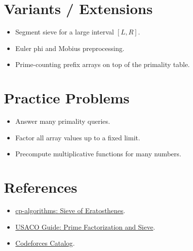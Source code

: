 \section*{Variants / Extensions}

\begin{itemize}
  \item Segment sieve for a large interval \([L, R]\).
  \item Euler phi and Mobius preprocessing.
  \item Prime-counting prefix arrays on top of the primality table.
\end{itemize}

\section*{Practice Problems}

\begin{itemize}
  \item Answer many primality queries.
  \item Factor all array values up to a fixed limit.
  \item Precompute multiplicative functions for many numbers.
\end{itemize}

\section*{References}

\begin{itemize}
  \item \href{https://cp-algorithms.com/algebra/sieve-of-eratosthenes.html}{cp-algorithms: Sieve of Eratosthenes}.
  \item \href{https://usaco.guide/gold/prime-factorization}{USACO Guide: Prime Factorization and Sieve}.
  \item \href{https://codeforces.com/catalog}{Codeforces Catalog}.
\end{itemize}
